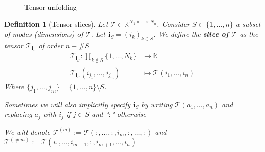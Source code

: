 \documentclass[11pt,a4paper,openright,oneside]{book}
\numberwithin{equation}{section}
\newtheorem{defn0}{Definition}[chapter]
\newenvironment{definition}{ \begin{defn0}}{\end{defn0}}
\begin{document}
\begin{figure}[h]
    \centering
    \label{fig:mode_unfolding}
    \caption{Tensor unfolding}
\end{figure}

\begin{definition}[Tensor slices]

    Let $\mathcal{T} \in \mathbb{K}^{N_1\times \cdots \times N_n}$. Consider $S \subset \{1, \dots, n\}$ a subset of modes (dimensions)
    of $\mathcal{T}$. Let $\mathbf{i}_S = (i_k)_{k \in S}$. We define the \textbf{slice of $\mathcal{T}$} as the tensor $\mathcal{T}_{\mathbf{i}_S}$
    of order $n - \#S$
    $$\begin{align}
        \mathcal{T}_{\mathbf{i}_S} : \prod_{k \not\in S} \{1, \dots, N_k\} & \longrightarrow \mathbb{K} \\
        \mathcal{T}_{\mathbf{i}_S}(i_{j_1}, \dots, i_{j_m}) & \longmapsto \mathcal{T}(i_1, \dots, i_n)
    \end{align}$$
    Where $\{j_1, \dots, j_m\} = \{1, \dots, n\} \setminus S$. 

    Sometimes we will also implicitly specify $\mathbf{i}_S$ by writing $\mathcal{T}(a_1, \dots, a_n)$ and replacing $a_j$ with $i_j$ if $j \in S$ and "$:$" otherwise

    We will denote $\mathcal{T}^{(m)} := \mathcal{T}(:, \dots, :, i_m, :, \dots, :)$ and $\mathcal{T}^{(\neq m)} := \mathcal{T}(i_1, \dots, i_{m-1}, :, i_{m+1}, \dots, i_n)$
\end{definition}
\end{document}
